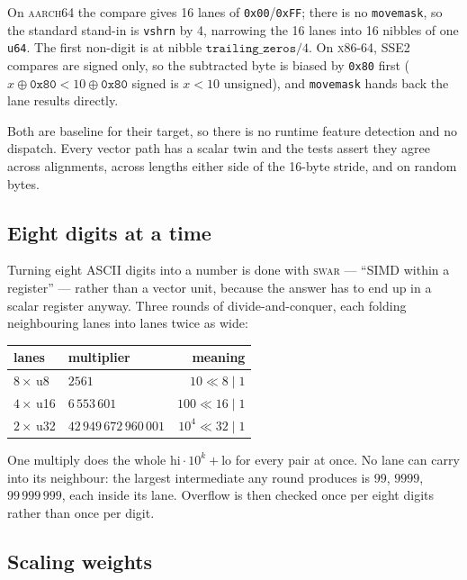 \documentclass[11pt,a4paper]{article}
\begin{document}
On \textsc{aarch64} the compare gives 16 lanes of \texttt{0x00}/\texttt{0xFF};
there is no \texttt{movemask}, so the standard stand-in is \texttt{vshrn} by 4,
narrowing the 16 lanes into 16 nibbles of one \texttt{u64}. The first non-digit
is at nibble $\texttt{trailing\_zeros}/4$. On \textsc{x86-64}, SSE2 compares are
signed only, so the subtracted byte is biased by \texttt{0x80} first
($x \oplus \texttt{0x80} < 10 \oplus \texttt{0x80}$ signed is $x<10$ unsigned),
and \texttt{movemask} hands back the lane results directly.

Both are baseline for their target, so there is no runtime feature detection and
no dispatch. Every vector path has a scalar twin and the tests assert they agree
across alignments, across lengths either side of the 16-byte stride, and on
random bytes.

\subsection{Eight digits at a time}

Turning eight ASCII digits into a number is done with \textsc{swar} --- ``SIMD
within a register'' --- rather than a vector unit, because the answer has to end
up in a scalar register anyway. Three rounds of divide-and-conquer, each folding
neighbouring lanes into lanes twice as wide:

\begin{center}
\begin{tabular}{llr}
\toprule
lanes & multiplier & meaning \\
\midrule
$8\times$\,u8  & $2561$            & $10 \ll 8 \mid 1$ \\
$4\times$\,u16 & $6\,553\,601$     & $100 \ll 16 \mid 1$ \\
$2\times$\,u32 & $42\,949\,672\,960\,001$ & $10^4 \ll 32 \mid 1$ \\
\bottomrule
\end{tabular}
\end{center}

One multiply does the whole $\text{hi}\cdot10^k+\text{lo}$ for every pair at
once. No lane can carry into its neighbour: the largest intermediate any round
produces is $99$, $9999$, $99\,999\,999$, each inside its lane. Overflow is then
checked once per eight digits rather than once per digit.

\subsection{Scaling weights}
\end{document}
